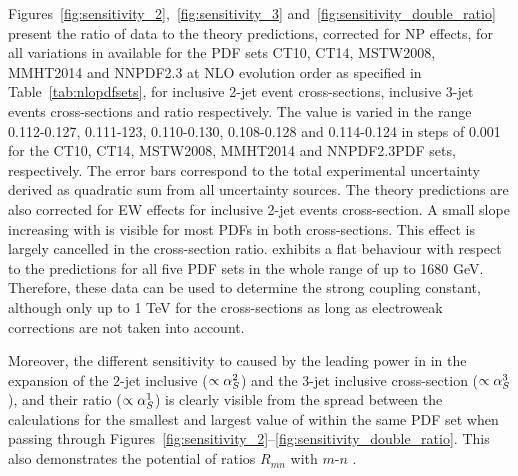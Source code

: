 Figures~\ref{fig:sensitivity_2},~\ref{fig:sensitivity_3} and~\ref{fig:sensitivity_double_ratio} present the ratio of data to the theory predictions, corrected for NP effects, for all variations in \alpsmz available for the PDF sets CT10, CT14, MSTW2008, MMHT2014 and NNPDF2.3 at NLO evolution order as specified in Table~\ref{tab:nlopdfsets}, for inclusive 2-jet event cross-sections, inclusive 3-jet events cross-sections and ratio \ratio respectively. The \alpsmz value is varied in the range 0.112-0.127, 0.111-123, 0.110-0.130, 0.108-0.128 and 0.114-0.124 in steps of 0.001 for the CT10, CT14, MSTW2008, MMHT2014 and NNPDF2.3PDF sets, respectively. The error bars correspond to the total experimental uncertainty derived as quadratic sum from all uncertainty sources. The theory predictions are also corrected for EW effects for inclusive 2-jet events cross-section. A small slope increasing with \httwo is visible for most PDFs in both cross-sections. This effect is largely cancelled in the cross-section ratio. \ratio exhibits a flat behaviour with respect to the predictions for all five PDF sets in the whole range of \httwo up to 1680 GeV. Therefore, these data can be used to determine the strong coupling constant, although only up to 1 TeV for the cross-sections as long as electroweak corrections are not taken into account.

Moreover, the different sensitivity to \alpsmz caused by the leading power in \alps in the expansion of the 2-jet inclusive ($\propto\alpha_S^2$) and the 3-jet inclusive cross-section ($\propto\alpha_S^3$), and their ratio ($\propto\alpha_S^1$) is clearly visible from the spread between the calculations for the smallest and largest value of \alpsmz within the same PDF set when passing through Figures~\ref{fig:sensitivity_2}--\ref{fig:sensitivity_double_ratio}.  This also demonstrates the potential of ratios $R_{mn}$ with $m$-$n$ .

